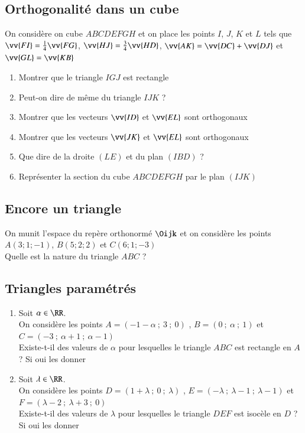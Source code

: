 \documentclass[oneside,12pt]{article}          %
\begin{document}
\subsection{Orthogonalité dans un cube}
On considère on cube $ABCDEFGH$ et on place les points $I$, $J$, $K$ et $L$ tels que $\vv{FI}=\frac{1}{4}\vv{FG} $, $\vv{HJ}=\frac{3}{4}\vv{HD} $, $\vv{AK}=\vv{DC}+\vv{DJ}$ et $\vv{GL}=\vv{KB}$
\begin{enumerate}
	\item Montrer que le triangle $IGJ$ est rectangle
    \item Peut-on dire de même du triangle $IJK$ ?
    \item Montrer que les vecteurs $\vv{ID}$ et $\vv{EL}$ sont orthogonaux
    \item Montrer que les vecteurs $\vv{JK}$ et $\vv{EL}$ sont orthogonaux
    \item Que dire de la droite $(LE)$ et du plan $(IBD)$ ?
    \item Représenter la section du cube $ABCDEFGH$ par le plan $(IJK)$
\end{enumerate}



\subsection{Encore un triangle}
On munit l'espace du repère orthonormé $\Oijk$ et on considère les points $A(3;1;-1)$, $ B(5;2;2)$ et $C(6;1;-3)$\\
Quelle est la nature du triangle $ABC$ ?



\subsection{Triangles paramétrés}
\begin{enumerate}
    \item Soit $\alpha\in\RR$.\\
    On considère les points $A=(-1-\alpha~;~3~;~0)$ , $B=(0~;~\alpha~;~1)$ et $C=(-3~;~\alpha+1~;~\alpha-1)$ \\
    Existe-t-il des valeurs de $\alpha$ pour lesquelles le triangle $ABC$ est rectangle en $A$ ? Si oui les donner
    \item Soit $\lambda\in\RR$.\\
    On considère les points $D=(1+\lambda~;~0~;~\lambda)$ , $E=(-\lambda~;~\lambda-1~;~\lambda-1)$ et $F=(\lambda-2~;~\lambda+3~;~0)$\\
    Existe-t-il des valeurs de $\lambda$ pour lesquelles le triangle $DEF$ est isocèle en $D$ ? Si oui les donner
\end{enumerate}
\end{document}

